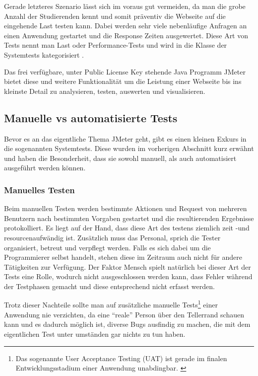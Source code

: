 \documentclass[a4paper,12pt]{article}
\begin{document}
Gerade letzteres Szenario lässt sich im voraus gut vermeiden, da man die grobe Anzahl der Studierenden kennt und somit präventiv die Webseite auf die eingehende Last testen kann. Dabei werden sehr viele nebenläufige Anfragen an einen Anwendung gestartet und die Response Zeiten ausgewertet. Diese Art von Tests nennt man Last oder Performance-Tests und wird in die Klasse der Systemtests kategorisiert \cite{online:LastUndPerformanceTest}. 

Das frei verfügbare, unter Public License Key stehende Java Programm JMeter bietet diese und weitere Funktionalität um die Leistung einer Webseite bis ins kleinste Detail zu analysieren, testen, auswerten und visualisieren.

\subsection{Manuelle vs automatisierte Tests}
Bevor es an das eigentliche Thema JMeter geht, gibt es einen kleinen Exkurs in die sogenannten Systemtests. Diese wurden im vorherigen Abschnitt kurz erwähnt und haben die Besonderheit, dass sie sowohl manuell, als auch automatisiert ausgeführt werden können. 

\subsubsection{Manuelles Testen}
Beim manuellen Testen werden bestimmte Aktionen und Request von mehreren Benutzern nach bestimmten Vorgaben gestartet und die resultierenden Ergebnisse protokolliert. Es liegt auf der Hand, dass diese Art des testens ziemlich zeit -und resourcenaufwändig ist. Zusätzlich muss das Personal, sprich die Tester organisiert, betreut und verpflegt werden. Falls es sich dabei um die Programmierer selbst handelt, stehen diese im Zeitraum auch nicht für andere Tätigkeiten zur Verfügung. Der Faktor Mensch spielt natürlich bei dieser Art der Tests eine Rolle, wodurch nicht ausgeschlossen werden kann, dass Fehler während der Testphasen gemacht und diese entsprechend nicht erfasst werden. \cite[S. 11]{book:ApacheJMeter}

Trotz dieser Nachteile sollte man auf zusätzliche manuelle Tests\footnote{Das sogenannte User Acceptance Testing (UAT) ist gerade im finalen Entwicklungsstadium einer Anwendung unabdingbar. \cite{online:wikiUAT}} einer Anwendung nie verzichten, da eine "`reale"' Person über den Tellerrand schauen kann und es dadurch möglich ist, diverse Bugs ausfindig zu machen, die mit dem eigentlichen Test unter umständen gar nichts zu tun haben.
\end{document}
